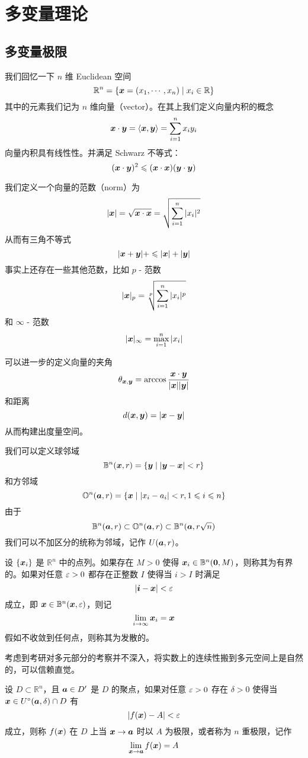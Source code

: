\chapter{多变量理论}

\section{多变量极限}

我们回忆一下 $n$ 维 Euclidean 空间
\[ \mathbb{R}^n = \{\boldsymbol{x} = (x_1,\cdots,x_n) \mid x_i \in \mathbb{R} \} \]
其中的元素我们记为 $n$ 维向量（vector）。在其上我们定义向量内积的概念
\[ \boldsymbol{x} \cdot \boldsymbol{y} = \langle \boldsymbol{x}, \boldsymbol{y} \rangle= \sum_{i=1}^{n} x_i y_i \]
向量内积具有线性性。并满足 Schwarz 不等式：
\[ (\boldsymbol{x} \cdot \boldsymbol{y})^2 \leqslant (\boldsymbol{x} \cdot \boldsymbol{x})(\boldsymbol{y} \cdot \boldsymbol{y}) \]

我们定义一个向量的范数（norm）为
\[ |\boldsymbol{x}| = \sqrt{\boldsymbol{x} \cdot \boldsymbol{x}} = \sqrt{\sum_{i=1}^{n} |x_i|^2}  \]
从而有三角不等式
\[ |\boldsymbol{x} + \boldsymbol{y}| +\leqslant |\boldsymbol{x}| + |\boldsymbol{y}| \]
事实上还存在一些其他范数，比如 $p$ - 范数
\[ |\boldsymbol{x}|_p = \sqrt[p]{\sum_{i=1}^{n} |x_i|^p}  \]
和 $\infty$ - 范数
\[ |\boldsymbol{x}|_\infty = \max_{i=1}^{n} |x_i|  \]

可以进一步的定义向量的夹角
\[ \theta_{\boldsymbol{x}, \boldsymbol{y}} = \arccos\frac{\boldsymbol{x} \cdot \boldsymbol{y}}{|\boldsymbol{x}||\boldsymbol{y}|} \]
和距离
\[ d(\boldsymbol{x}, \boldsymbol{y}) = |\boldsymbol{x}-\boldsymbol{y}| \]
从而构建出度量空间。

我们可以定义球邻域
\[ \mathbb{B}^n(\boldsymbol{x}, r) = \{ \boldsymbol{y} \mid |\boldsymbol{y}-\boldsymbol{x}| < r \} \]
和方邻域
\[ \mathbb{O}^n(\boldsymbol{a}, r) = \{ \boldsymbol{x} \mid |x_i - a_i| < r, 1 \leqslant i \leqslant n \} \]
由于
\[ \mathbb{B}^n(\boldsymbol{a}, r) \subset \mathbb{O}^n(\boldsymbol{a}, r) \subset \mathbb{B}^n(\boldsymbol{a}, r\sqrt{n})  \]
我们可以不加区分的统称为邻域，记作 $U(\boldsymbol{a}, r)$。

\begin{definition}
	设 $\{\boldsymbol{x}_i\}$ 是 $\mathbb{R}^n$ 中的点列。如果存在 $M > 0$ 使得 $\boldsymbol{x}_i \in \mathbb{B}^n(\boldsymbol{0}, M)$，则称其为有界的。如果对任意 $\varepsilon > 0$ 都存在正整数 $I$ 使得当 $i > I$ 时满足
	\[ |\boldsymbol{i} - \boldsymbol{x}| < \varepsilon \]
	成立，即 $\boldsymbol{x} \in \mathbb{B}^n(\boldsymbol{x}, \varepsilon)$，则记
	\[ \lim_{i \to \infty} \boldsymbol{x}_i = \boldsymbol{x} \]
	假如不收敛到任何点，则称其为发散的。
\end{definition}

考虑到考研对多元部分的考察并不深入，将实数上的连续性搬到多元空间上是自然的，可以信赖直觉。

\begin{definition}
	设 $D \subset \mathbb{R}^n$，且 $\boldsymbol{a} \in D'$ 是 $D$ 的聚点，如果对任意 $\varepsilon > 0$ 存在 $\delta > 0$ 使得当 $\boldsymbol{x} \in U^{\circ}(\boldsymbol{a}, \delta) \cap D$ 有
	\[ |f(\boldsymbol{x}) - A| < \varepsilon \]
	成立，则称 $f(\boldsymbol{x})$ 在 $D$ 上当 $\boldsymbol{x} \to \boldsymbol{a}$ 时以 $A$ 为极限，或者称为 $n$ 重极限，记作
	\[ \lim_{\boldsymbol{x} \to \boldsymbol{a}} f(\boldsymbol{x}) = A \]
\end{definition}

